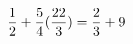 \documentclass[preview]{standalone}
\begin{document}
\begin{align*}
\special{dvisvgm:raw <g id='unique000'>}\frac{1}{2} + \frac{5}{4} (\frac{22}{3}) = \frac{2}{3} + 9\special{dvisvgm:raw </g>}
\end{align*}
\end{document}
